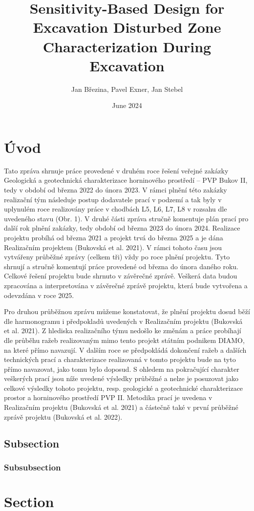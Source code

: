 \documentclass{surao}
\title{Sensitivity-Based Design for Excavation Disturbed Zone Characterization During Excavation}
\author{Jan Březina, Pavel Exner, Jan Stebel}
\date{June 2024}
\begin{document}
\maketitle


\section{Úvod}
Tato zpráva shrnuje práce provedené v druhém roce řešení veřejné zakázky Geologická a
geotechnická charakterizace horninového prostředí – PVP Bukov II, tedy v období od března
2022 do února 2023. V rámci plnění této zakázky realizační tým následuje postup dodavatele
prací v podzemí a tak byly v uplynulém roce realizovány práce v chodbách L5, L6, L7, L8
v rozsahu dle uvedeného stavu (Obr. 1). V druhé části zpráva stručně komentuje plán prací
pro další rok plnění zakázky, tedy období od března 2023 do února 2024.
Realizace projektu probíhá od března 2021 a projekt trvá do března 2025 a je dána
Realizačním projektem (Bukovská et al. 2021). V rámci tohoto času jsou vytvářeny průběžné
zprávy (celkem tři) vždy po roce plnění projektu. Tyto shrnují a stručně komentují práce
provedené od března do února daného roku. Celkové řešení projektu bude shrnuto
v závěrečné zprávě. Veškerá data budou zpracována a interpretována v závěrečné zprávě
projektu, která bude vytvořena a odevzdána v roce 2025.

Pro druhou průběžnou zprávu můžeme konstatovat, že plnění projektu dosud běží dle
harmonogramu i předpokladů uvedených v Realizačním projektu (Bukovská et al. 2021).
Z hlediska realizačního týmu nedošlo ke změnám a práce probíhají dle průběhu ražeb
realizovaným mimo tento projekt státním podnikem DIAMO, na které přímo navazují. V dalším
roce se předpokládá dokončení ražeb a dalších technických prací a charakterizace
realizovaná v tomto projektu bude na tyto přímo navazovat, jako tomu bylo doposud.
S ohledem na pokračující charakter veškerých prací jsou níže uvedené výsledky průběžné a
nelze je posuzovat jako celkové výsledky tohoto projektu, resp. geologické a geotechnické
charakterizace prostor a horninového prostředí PVP II. Metodika prací je uvedena
v Realizačním projektu (Bukovská et al. 2021) a částečně také v první průběžné zprávě
projektu (Bukovská et al. 2022).

\subsection{Subsection}
\subsubsection{Subsubsection}
\section{Section}
\end{document}
